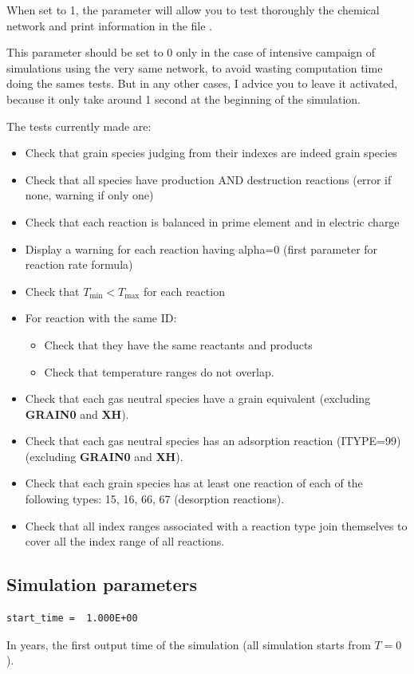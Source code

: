 \documentclass[english,a4paper,twoside]{article}
\begin{document}
When set to 1, the parameter  will allow you to test thoroughly the chemical network and print information in the file . 

\begin{remarque}
This parameter should be set to 0 only in the case of intensive campaign of simulations using the very same network, to avoid wasting computation time doing the sames tests. But in any other cases, I advice you to leave it activated, because it only take around 1 second at the beginning of the simulation.
\end{remarque}

The tests currently made are:
\begin{itemize}
\item Check that grain species judging from their indexes are indeed grain species
\item Check that all species have production AND destruction reactions (error if none, warning if only one)
\item Check that each reaction is balanced in prime element and in electric charge
\item Display a warning for each reaction having alpha=0 (first parameter for reaction rate formula)
\item Check that $T_\text{min} < T_\text{max}$ for each reaction
\item For reaction with the same ID:
\begin{itemize}
\item Check that they have the same reactants and products
\item Check that temperature ranges do not overlap.
\end{itemize}
\item Check that each gas neutral species have a grain equivalent (excluding \textbf{GRAIN0} and \textbf{XH}).
\item Check that each gas neutral species has an adsorption reaction (ITYPE=99) (excluding \textbf{GRAIN0} and \textbf{XH}).
\item Check that each grain species has at least one reaction of each of the following types: 15, 16, 66, 67 (desorption reactions).
\item Check that all index ranges associated with a reaction type join themselves to cover all the index range of all reactions.
\end{itemize}

\subsection{Simulation parameters}
\begin{verbatim}
start_time =  1.000E+00
\end{verbatim}
In years, the first output time of the simulation (all simulation starts from $T=0$).
\end{document}

